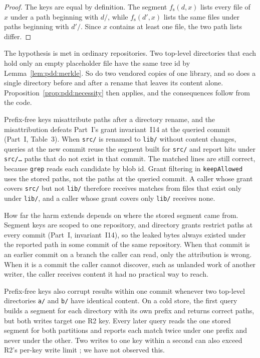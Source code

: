 \documentclass[11pt,letterpaper]{article}
\theoremstyle{definition}
\theoremstyle{remark}
\DeclareRobustCommand{\code}[1]{{\def\_{\textunderscore\allowbreak}\texttt{#1}}}
\begin{document}
\begin{proof}
The keys are equal by definition. The segment $f_{\mathrm{s}}(d,x)$ lists every file of $x$ under a path beginning with $d/$, while $f_{\mathrm{s}}(d',x)$ lists the same files under paths beginning with $d'/$. Since $x$ contains at least one file, the two path lists differ.
\end{proof}

The hypothesis is met in ordinary repositories. Two top-level directories that each hold only an empty placeholder file have the same tree id by Lemma~\ref{lem:pdd:merkle}. So do two vendored copies of one library, and so does a single directory before and after a rename that leaves its content alone. Proposition~\ref{prop:pdd:necessity} then applies, and the consequences follow from the code.

Prefix-free keys misattribute paths after a directory rename, and the misattribution defeats Part~I's grant invariant~I14 at the queried commit (Part~I, Table~3). When \code{src/} is renamed to \code{lib/} without content changes, queries at the new commit reuse the segment built for \code{src/} and report hits under \code{src/\ldots} paths that do not exist in that commit. The matched lines are still correct, because \code{grep} reads each candidate by blob id. Grant filtering in \code{keepAllowed} uses the stored paths, not the paths at the queried commit. A caller whose grant covers \code{src/} but not \code{lib/} therefore receives matches from files that exist only under \code{lib/}, and a caller whose grant covers only \code{lib/} receives none.

How far the harm extends depends on where the stored segment came from. Segment keys are scoped to one repository, and directory grants restrict paths at every commit (Part~I, invariant~I14), so the leaked bytes always existed under the reported path in some commit of the same repository. When that commit is an earlier commit on a branch the caller can read, only the attribution is wrong. When it is a commit the caller cannot discover, such as unlanded work of another writer, the caller receives content it had no practical way to reach.

Prefix-free keys also corrupt results within one commit whenever two top-level directories \code{a/} and \code{b/} have identical content. On a cold store, the first query builds a segment for each directory with its own prefix and returns correct paths, but both writes target one R2 key. Every later query reads the one stored segment for both partitions and reports each match twice under one prefix and never under the other. Two writes to one key within a second can also exceed R2's per-key write limit \cite{cfr2limits}; we have not observed this.
\end{document}
